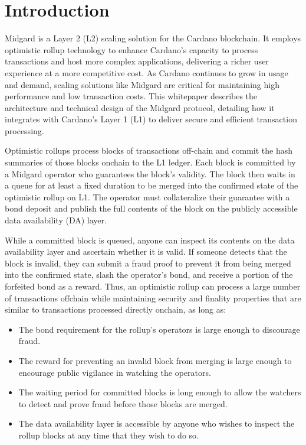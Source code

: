 \documentclass[../midgard.tex]{subfiles}
\begin{document}
\section*{Introduction}
\label{h:introduction}

Midgard is a Layer 2 (L2) scaling solution for the Cardano blockchain.
It employs optimistic rollup technology to enhance Cardano's capacity to process transactions and host more complex applications, delivering a richer user experience at a more competitive cost.
As Cardano continues to grow in usage and demand, scaling solutions like Midgard are critical for maintaining high performance and low transaction costs.
This whitepaper describes the architecture and technical design of the Midgard protocol, detailing how it integrates with Cardano's Layer 1 (L1) to deliver secure and efficient transaction processing.

Optimistic rollups process blocks of transactions off-chain and commit the hash summaries of those blocks onchain to the L1 ledger.
Each block is committed by a Midgard operator who guarantees the block's validity.
The block then waits in a queue for at least a fixed duration to be merged into the confirmed state of the optimistic rollup on L1.
The operator must collateralize their guarantee with a bond deposit and publish the full contents of the block on the publicly accessible data availability (DA) layer.

While a committed block is queued, anyone can inspect its contents on the data availability layer and ascertain whether it is valid.
If someone detects that the block is invalid, they can submit a fraud proof to prevent it from being merged into the confirmed state, slash the operator's bond, and receive a portion of the forfeited bond as a reward.
Thus, an optimistic rollup can process a large number of transactions offchain while maintaining security and finality properties that are similar to transactions processed directly onchain, as long as:
\begin{itemize}
    \item The bond requirement for the rollup's operators is large enough to discourage fraud.
    \item The reward for preventing an invalid block from merging is large enough to encourage public vigilance in watching the operators.
    \item The waiting period for committed blocks is long enough to allow the watchers to detect and prove fraud before those blocks are merged.
    \item The data availability layer is accessible by anyone who wishes to inspect the rollup blocks at any time that they wish to do so.
\end{itemize}
\end{document}
